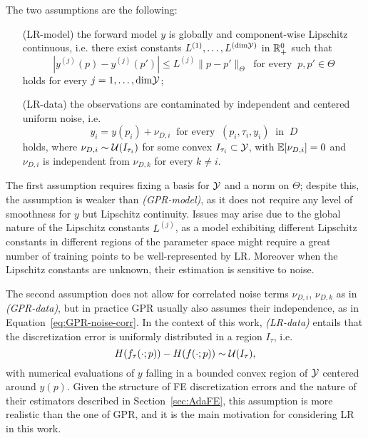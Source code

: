 The two assumptions are the following:
\begin{itemize}[font=\itshape, leftmargin=1.5cm, align=right, labelwidth=2.4cm]
    \item[(LR-model)] the forward model $y$ is globally and component-wise Lipschitz continuous, i.e. there exist constants $L^{(1)},\dots, L^{(\text{dim}\mathcal Y)}$ in $\mathbb{R}_+^0$ such that 
    \[
        |y^{(j)}(p) - y^{(j)}(p')| \leq L^{(j)} \|p - p'\|_\Theta \ \text{ for every } \ p, p' \in \Theta
    \]
    holds for every $j = 1, \dots, \text{dim}\mathcal Y$;
    \item[(LR-data)] the observations are contaminated by independent and centered uniform noise, i.e. 
    \[ 
        y_i = y(p_i) + \nu_{D,i} \ \text{ for every } \ (p_i,\tau_i,y_i) \ \text{ in } \ D
    \] 
    holds, where $\nu_{D,i} \sim \mathcal U(I_{\tau_i})$ for some convex $I_{\tau_i} \subset \mathcal Y$, with $\mathbb E[\nu_{D,i}] = 0$ and $\nu_{D,i}$ is independent from $\nu_{D,k}$ for every $k \neq i$.
\end{itemize}  
The first assumption requires fixing a basis for $\mathcal Y$ and a norm on $\Theta$; despite this, the assumption is weaker than \textit{(GPR-model)}, as it does not require any level of smoothness for $y$ but Lipschitz continuity. \newline
Issues may arise due to the global nature of the Lipschitz constants $L^{(j)}$, as a model exhibiting different Lipschitz constants in different regions of the parameter space might require a great number of training points to be well-represented by LR. 
Moreover when the Lipschitz constants are unknown, their estimation is sensitive to noise.

The second assumption does not allow for correlated noise terms $\nu_{D,i}$, $\nu_{D,k}$ as in \textit{(GPR-data)}, but in practice GPR usually also assumes their independence, as in Equation~\ref{eq:GPR-noise-corr}. 
In the context of this work, \textit{(LR-data)} entails that the discretization error is uniformly distributed in a region $I_\tau$, i.e. 
\[
    H(f_{\tau}(\cdot; p)) - H(f(\cdot; p)) \sim \mathcal U(I_\tau),
\] 
with numerical evaluations of $y$ falling in a bounded convex region of $\mathcal Y$ centered around $y(p)$. \newline
Given the structure of FE discretization errors and the nature of their estimators described in Section~\ref{sec:AdaFE}, this assumption is more realistic than the one of GPR, and it is the main motivation for considering LR in this work. \medbreak

